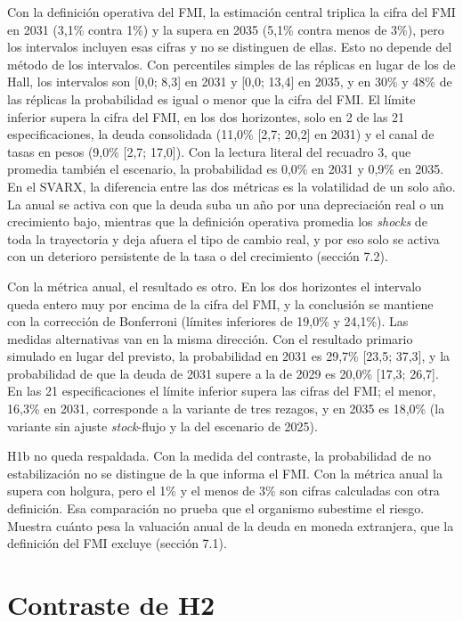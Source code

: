 Con la definición operativa del FMI, la estimación central triplica la
cifra del FMI en 2031 (3,1\% contra 1\%) y la supera en 2035 (5,1\%
contra menos de 3\%), pero los intervalos incluyen esas cifras y no se
distinguen de ellas. Esto no depende del método de los intervalos. Con
percentiles simples de las réplicas en lugar de los de Hall, los
intervalos son {[}0,0; 8,3{]} en 2031 y {[}0,0; 13,4{]} en 2035, y en
30\% y 48\% de las réplicas la probabilidad es igual o menor que la
cifra del FMI. El límite inferior supera la cifra del FMI, en los dos
horizontes, solo en 2 de las 21 especificaciones, la deuda consolidada
(11,0\% {[}2,7; 20,2{]} en 2031) y el canal de tasas en pesos (9,0\%
{[}2,7; 17,0{]}). Con la lectura literal del recuadro 3, que promedia
también el escenario, la probabilidad es 0,0\% en 2031 y 0,9\% en 2035.
En el SVARX, la diferencia entre las dos métricas es la volatilidad de
un solo año. La anual se activa con que la deuda suba un año por una
depreciación real o un crecimiento bajo, mientras que la definición
operativa promedia los \emph{shocks} de toda la trayectoria y deja
afuera el tipo de cambio real, y por eso solo se activa con un deterioro
persistente de la tasa o del crecimiento (sección 7.2).

Con la métrica anual, el resultado es otro. En los dos horizontes el
intervalo queda entero muy por encima de la cifra del FMI, y la
conclusión se mantiene con la corrección de Bonferroni (límites
inferiores de 19,0\% y 24,1\%). Las medidas alternativas van en la misma
dirección. Con el resultado primario simulado en lugar del previsto, la
probabilidad en 2031 es 29,7\% {[}23,5; 37,3{]}, y la probabilidad de
que la deuda de 2031 supere a la de 2029 es 20,0\% {[}17,3; 26,7{]}. En
las 21 especificaciones el límite inferior supera las cifras del FMI; el
menor, 16,3\% en 2031, corresponde a la variante de tres rezagos, y en
2035 es 18,0\% (la variante sin ajuste \emph{stock}-flujo y la del
escenario de 2025).

H1b no queda respaldada. Con la medida del contraste, la probabilidad de
no estabilización no se distingue de la que informa el FMI. Con la
métrica anual la supera con holgura, pero el 1\% y el menos de 3\% son
cifras calculadas con otra definición. Esa comparación no prueba que el
organismo subestime el riesgo. Muestra cuánto pesa la valuación anual de
la deuda en moneda extranjera, que la definición del FMI excluye
(sección 7.1).

\section{Contraste de H2}

